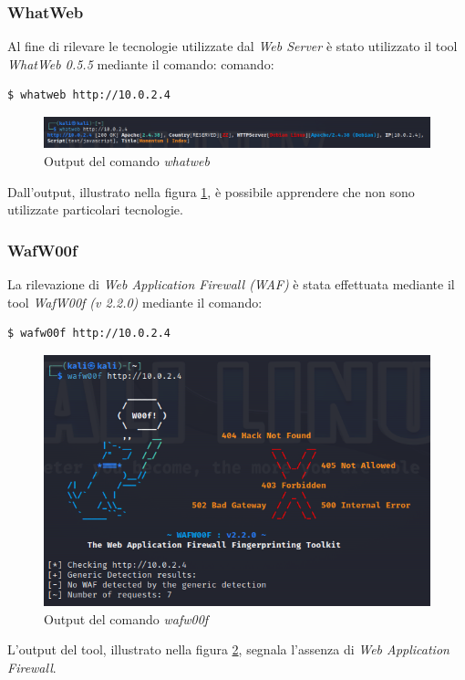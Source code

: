\subsubsection{WhatWeb}
Al fine di rilevare le tecnologie utilizzate dal \emph{Web Server} è stato utilizzato il tool \emph{WhatWeb 0.5.5} mediante il comando:
comando:
\begin{lstlisting}[language=bash]
    $ whatweb http://10.0.2.4 
\end{lstlisting}
\begin{figure}[h]
    \centering
    \includegraphics[scale=0.5]{capitoli/images/whatweb.png}
    \caption{Output del comando \emph{whatweb}}
    \label{fig:whatweb}
\end{figure}
Dall'output, illustrato nella figura \ref{fig:whatweb}, è possibile apprendere che non sono utilizzate particolari tecnologie. 
\subsubsection{WafW00f}
La rilevazione di \emph{Web Application Firewall (WAF)} è stata effettuata mediante il tool \emph{WafW00f (v 2.2.0)} mediante il comando:
\begin{lstlisting}[language=bash]
    $ wafw00f http://10.0.2.4
\end{lstlisting}
\begin{figure}[h]
    \centering
    \includegraphics[scale=0.5]{capitoli/images/wafwoof.png}
    \caption{Output del comando \emph{wafw00f}}
    \label{fig:wafwoof}
\end{figure}
L'output del tool, illustrato nella figura \ref{fig:wafwoof}, segnala l'assenza di \emph{Web Application Firewall}.
